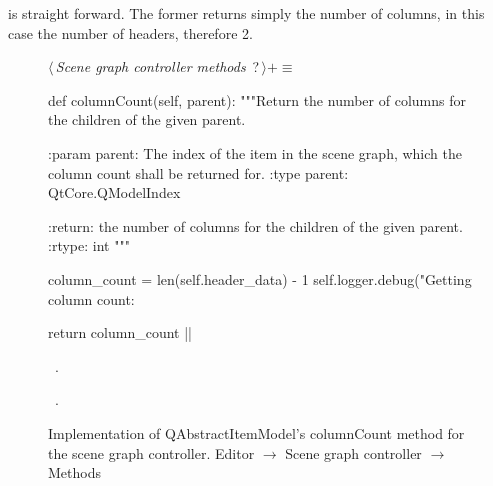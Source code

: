\documentclass[%
    a4paper,    %
    justified,  %
    nobib,      %
    openany     %
]{tufte-book}
\begin{document}
 is straight
forward. The former returns simply the number of columns, in this case the
number of headers, therefore 2.

\begin{figure}
\begin{flushleft} \small
\begin{minipage}{\linewidth}\label{scrap33}\raggedright\small
{} $\langle\,${\itshape Scene graph controller methods}\nobreak\ {\footnotesize {?}}$\,\rangle+\equiv$
\vspace{-1ex}
\begin{pythoncode}
def columnCount(self, parent):
    """Return the number of columns for the children of the given
    parent.

    :param parent: The index of the item in the scene graph, which
                   the column count shall be returned for.
    :type  parent: QtCore.QModelIndex

    :return: the number of columns for the children of the given
             parent.
    :rtype:  int
    """

    column_count = len(self.header_data) - 1
    self.logger.debug("Getting column count: %

    return column_count
|\NWsep|
\end{pythoncode}
\vspace{1.5ex}
\footnotesize
\begin{list}{}{\setlength{\itemsep}{-\parsep}\setlength{\itemindent}{-\leftmargin}}
\item \NWtxtMacroDefBy\ .
\item \NWtxtMacroRefIn\ .

\item{}
\end{list}
\end{minipage}\vspace{4ex}
\end{flushleft}
\caption{Implementation of QAbstractItemModel's columnCount method for the scene
  graph controller.
  \newline{}\newline{}Editor $\rightarrow$ Scene graph controller $\rightarrow$
  Methods}
\label{editor:lst:scene-graph-controller:methods:column-count}
\end{figure}
\end{document}
